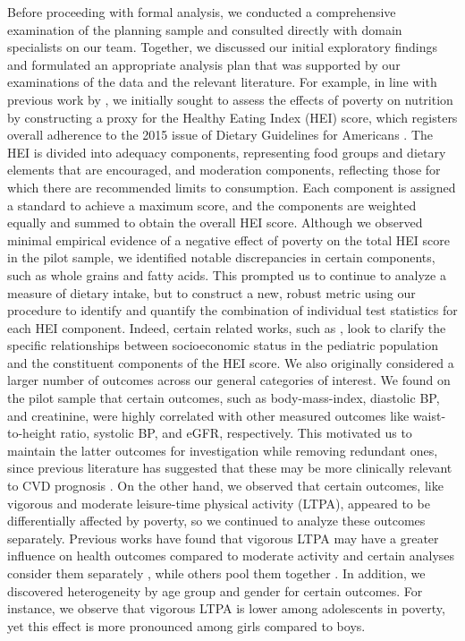 \documentclass[12pt,leqno,titlepage]{amsart}
\newcommand{\1}{\mathbbm{1}}
\begin{document}
\begin{bibunit}
Before proceeding with formal analysis, we conducted a comprehensive examination of the planning sample and consulted directly with domain specialists on our team. 
Together, we discussed our initial exploratory findings and formulated an appropriate analysis plan that was supported by our examinations of the data and the relevant literature. For example, in line with previous work by \cite{jackson2018income}, we initially sought to assess the effects of poverty on nutrition by constructing a proxy for the Healthy Eating Index (HEI) score, which registers overall adherence to the 2015 issue of Dietary Guidelines for Americans 
\citep{krebs2018update}. The HEI is divided into adequacy components, representing food groups and dietary elements that are encouraged, and moderation components, reflecting those for which there are recommended limits to consumption. Each component is assigned a standard to achieve a maximum score, and the components are weighted equally and summed to obtain the overall HEI score.
Although we observed minimal empirical evidence of a negative effect of poverty on the total HEI score in the pilot sample, we identified notable discrepancies in certain components, such as whole grains and fatty acids. This prompted us to continue to analyze a measure of dietary intake, but to construct a new, robust metric using our procedure to identify and quantify the combination of individual test statistics for each HEI component. Indeed, certain related works, such as \cite{hiza2013diet}, look to clarify the specific relationships between socioeconomic status in the pediatric population and the constituent components of the HEI score. We also originally considered a larger number of outcomes across our general categories of interest. We found on the pilot sample that certain outcomes, such as body-mass-index, diastolic BP, and creatinine, were highly correlated with other measured outcomes like waist-to-height ratio, systolic BP, and eGFR, respectively. This motivated us to maintain  the latter outcomes for investigation while removing redundant ones, since previous literature has suggested that these may be more clinically relevant to CVD prognosis \citep{kannel1971systolic, yoo2016waist}. On the other hand, we observed that certain outcomes, like vigorous and moderate leisure-time physical activity (LTPA), appeared to be differentially affected by poverty, so we continued to analyze these outcomes separately. Previous works have found that vigorous LTPA may have a greater influence on health outcomes compared to moderate activity \citep{owens2017case} and certain analyses consider them separately \citep{falese2021association}, while others pool them together \citep{nader2008moderate}. 
In addition, we discovered heterogeneity by age group and gender for certain outcomes. For instance, we observe that vigorous LTPA is lower among adolescents in poverty, yet this effect is more pronounced among girls compared to boys. 


\end{bibunit}
\end{document}
